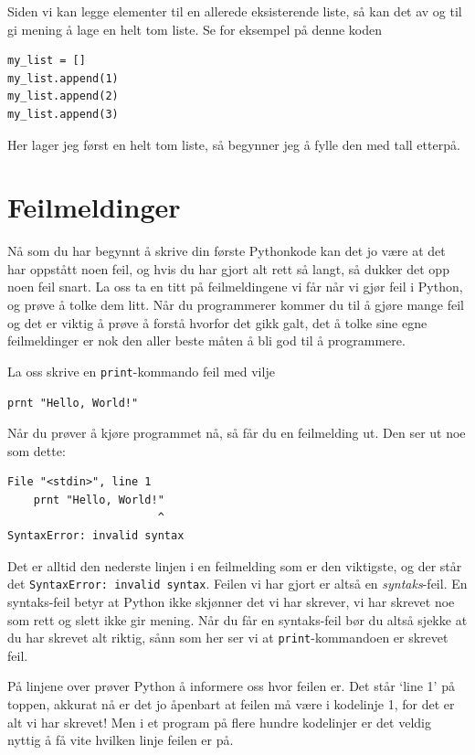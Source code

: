 \documentclass[a4paper, 11pt, notitlepage]{article}
\begin{document}
Siden vi kan legge elementer til en allerede eksisterende liste, så kan det av og til gi mening å lage en helt tom liste. Se for eksempel på denne koden
\begin{lstlisting}
my_list = []
my_list.append(1)
my_list.append(2)
my_list.append(3)
\end{lstlisting}
Her lager jeg først en helt tom liste, så begynner jeg å fylle den med tall etterpå.



\section*{Feilmeldinger}

Nå som du har begynnt å skrive din første Pythonkode kan det jo være at det har oppstått noen feil, og hvis du har gjort alt rett så langt, så dukker det opp noen feil snart. La oss ta en titt på feilmeldingene vi får når vi gjør feil i Python, og prøve å tolke dem litt. Når du programmerer kommer du til å gjøre mange feil og det er viktig å prøve å forstå hvorfor det gikk galt, det å tolke sine egne feilmeldinger er nok den aller beste måten å bli god til å programmere.

La oss skrive en \verb+print+-kommando feil med vilje
\begin{lstlisting}
prnt "Hello, World!"
\end{lstlisting}
Når du prøver å kjøre programmet nå, så får du en feilmelding ut. Den ser ut noe som dette:
\begin{verbatim}
File "<stdin>", line 1
    prnt "Hello, World!"
                       ^
SyntaxError: invalid syntax
\end{verbatim}

Det er alltid den nederste linjen i en feilmelding som er den viktigste, og der står det \verb+SyntaxError: invalid syntax+. Feilen vi har gjort er altså en \emph{syntaks}-feil. En syntaks-feil betyr at Python ikke skjønner det vi har skrever, vi har skrevet noe som rett og slett ikke gir mening. Når du får en syntaks-feil bør du altså sjekke at du har skrevet alt riktig, sånn som her ser vi at \verb+print+-kommandoen er skrevet feil. 

På linjene over prøver Python å informere oss hvor feilen er. Det står `line 1' på toppen, akkurat nå er det jo åpenbart at feilen må være i kodelinje 1, for det er alt vi har skrevet! Men i et program på flere hundre kodelinjer er det veldig nyttig å få vite hvilken linje feilen er på. 
\end{document}
